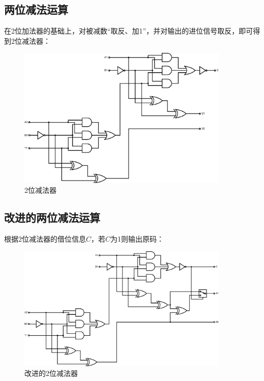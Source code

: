 \documentclass[a4paper]{article}
\begin{document}
\subsection{两位减法运算}

在2位加法器的基础上，对被减数“取反、加1”，并对输出的进位信号取反，即可得到2位减法器：

\begin{figure}[H]
    \centering
    \includegraphics[width=0.9\textwidth]{./assets/2-bit-sub.eps}
    \caption{2位减法器}
\end{figure}

\subsection{改进的两位减法运算}

根据2位减法器的借位信息$C$，若$C$为1则输出原码：

\begin{figure}[H]
    \centering
    \includegraphics[width=0.9\textwidth]{./assets/2-bit-sub-advanced.eps}
    \caption{改进的2位减法器}
\end{figure}
\end{document}
